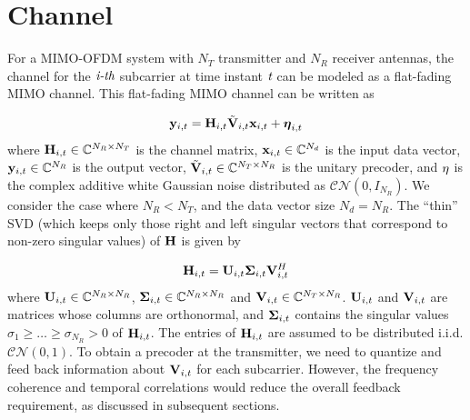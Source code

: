 \documentclass[11pt,a4paper]{report}
\def\bx{{\bf x}}
\def\by{{\bf y}}
\def\bSigma{{\bf \Sigma}}
\def\bH{{\bf H}}
\def\bU{{\bf U}}
\def\bV{{\bf V}}
\begin{document}
\section{Channel}
For a MIMO-OFDM system with $N_T$ transmitter and $N_R$
receiver antennas, the channel for the $\emph{i-th}$ subcarrier at time
instant $\emph{t}$ can be modeled as a flat-fading MIMO channel. This
flat-fading MIMO channel can be written as

\begin{equation}
\by_{i,t} = \bH_{i,t}\tilde{\bV}_{i,t} \bx_{i,t}+ {\boldsymbol{\eta}}_{i,t}
\end{equation}
where $\bH_{i,t} \in {\mathbb{C}}^{N_R \times N_T}$ is the channel
matrix, $\bx_{i,t} \in {\mathbb{C}}^{N_d}$ is the input data vector,
$\by_{i,t} \in {\mathbb{C}}^{N_R}$ is the output vector,
$\tilde{\bV}_{i,t} \in {\mathbb{C}}^{N_T \times N_R}$ is the unitary
precoder, and $\bf{\eta}$ is the complex additive white Gaussian noise
distributed as ${\mathcal{CN}}(0,I_{N_R})$. We consider the case where
$N_R < N_T$, and the data vector size $N_d = N_R$.  The ``thin'' SVD
(which keeps only those right and left singular vectors that correspond
to non-zero singular values) of $\bH$ is given by

\begin{equation}
\bH_{i,t} = \bU_{i,t} \bSigma_{i,t} \bV_{i,t}^{H}
\end{equation}
where $\bU_{i,t} \in \mathbb{C}^{N_R \times N_R}$,
$\bSigma_{i,t} \in \mathbb{C}^{N_R \times N_R}$ and
$\bV_{i,t} \in \mathbb{C}^{N_T \times N_R}$. $\bU_{i,t}$ and
$\bV_{i,t}$ are matrices whose columns are orthonormal, and
$\bSigma_{i,t}$ contains the singular values
$\sigma_1 \geq \ldots \geq \sigma_{N_R} > 0$ of $\bH_{i,t}$. The
entries of $\bH_{i,t}$ are assumed to be distributed
i.i.d. $\mathcal{CN}(0,1)$. To obtain a precoder at the
transmitter, we need to quantize and feed back information about
$\bV_{i,t}$ for each subcarrier. However, the frequency coherence and
temporal correlations would reduce the overall feedback requirement,
as discussed in subsequent sections.

\end{document}
